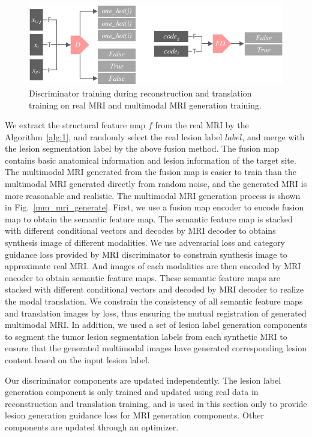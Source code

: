 \documentclass[letterpaper]{article} %
\begin{document}
\begin{figure}
	\centering
	\includegraphics[width=0.8\columnwidth]{figures/D}
	\caption{Discriminator training during reconstruction and translation training on real MRI and multimodal MRI generation training.}
	\label{train_D}
\end{figure}

We extract the structural feature map $f$ from the real MRI by the Algorithm~\ref{alg:1}, and randomly select the real lesion label $label$, and merge with the lesion segmentation label by the above fusion method. The fusion map contains basic anatomical information and lesion information of the target site. The multimodal MRI generated from the fusion map is easier to train than the multimodal MRI generated directly from random noise, and the generated MRI is more reasonable and realistic. The multimodal MRI generation process is shown in Fig.~\ref{mm_mri_generate}. First, we use a fusion map encoder to encode fusion map to obtain the semantic feature map. The semantic feature map is stacked with different conditional vectors and decodes by MRI decoder to obtains synthesis image of different modalities. We use adversarial loss and category guidance loss provided by MRI discriminator to constrain synthesis image to approximate real MRI. And images of each modalities are then encoded by MRI encoder to obtain semantic feature maps. These semantic feature maps are stacked with different conditional vectors and decoded by MRI decoder to realize the modal translation. We constrain the consistency of all semantic feature maps and translation images by loss, thus ensuring the mutual registration of generated multimodal MRI. In addition, we used a set of lesion label generation components to segment the tumor lesion segmentation labels from each synthetic MRI to ensure that the generated multimodal images have generated corresponding lesion content based on the input lesion label.

Our discriminator components are updated independently. The lesion label generation component is only trained and updated using real data in reconstruction and translation training, and is used in this section only to provide lesion generation guidance loss for MRI generation components. Other components are updated through an optimizer.
\end{document}
